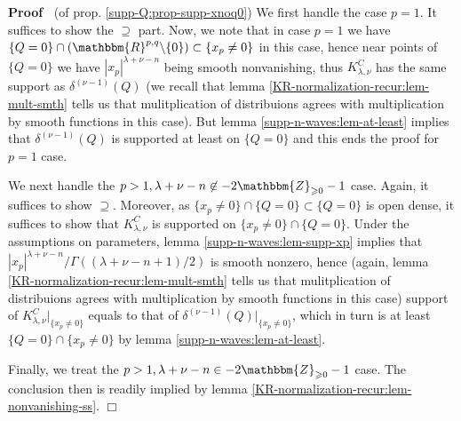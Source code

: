 \documentclass{article}
\newcommand{\nin}{\not\in}
\newenvironment{proof}{\noindent\textbf{Proof\ }}{\hspace*{\fill}$\Box$\medskip}
\numberwithin{definition}{section}
\numberwithin{lemma}{section}
\numberwithin{proposition}{section}
{\theorembodyfont{\rmfamily}\newtheorem{remark}{Remark}
\numberwithin{remark}{section}
}
\begin{document}
\begin{proof}
  (of prop. \ref{supp-Q:prop-supp-xnoq0}) We first handle the case $p = 1$. It
  suffices to show the $\supseteq$ part. Now, we note that in case $p = 1$ we
  have $\{ Q = 0 \} \cap ( \mathbbm{R}^{p, q} \backslash \{ 0 \}) \subset \{
  x_p \neq 0 \}$ in this case, hence near points of $\{ Q = 0 \}$ we have $|
  x_p |^{\lambda + \nu - n}$ being smooth nonvanishing, thus $K_{\lambda,
  \nu}^C$ has the same support as $\delta^{( \nu - 1)} ( Q)$ (we recall that
  lemma \ref{KR-normalization-recur:lem-mult-smth} tells us that
  mulitplication of distribuions agrees with multiplication by smooth
  functions in this case). But lemma \ref{supp-n-waves:lem-at-least} implies
  that $\delta^{( \nu - 1)} ( Q)$ is supported at least on $\{ Q = 0 \}$ and
  this ends the proof for $p = 1$ case.
  
  We next handle the $p > 1, \lambda + \nu - n \nin - 2\mathbbm{Z}_{\geqslant
  0} - 1$ case. Again, it suffices to show $\supseteq$. Moreover, as $\{ x_p
  \neq 0 \} \cap \{ Q = 0 \} \subset \{ Q = 0 \}$ is open dense, it suffices
  to show that $K_{\lambda, \nu}^C$ is supported on $\{ x_p \neq 0 \} \cap \{
  Q = 0 \}$. Under the assumptions on parameters, lemma
  \ref{supp-n-waves:lem-supp-xp} implies that $| x_p |^{\lambda + \nu - n} /
  \Gamma ( ( \lambda + \nu - n + 1) / 2)$ is smooth nonzero, hence (again,
  lemma \ref{KR-normalization-recur:lem-mult-smth} tells us that
  mulitplication of distribuions agrees with multiplication by smooth
  functions in this case) support of $K_{\lambda, \nu}^C |_{\{ x_p \neq 0 \}}$
  equals to that of $\delta^{( \nu - 1)} ( Q) |_{\{ x_p \neq 0 \}}$, which in
  turn is at least $\{ Q = 0 \} \cap \{ x_p \neq 0 \}$ by lemma
  \ref{supp-n-waves:lem-at-least}.
  
  Finally, we treat the $p > 1, \lambda + \nu - n \in -
  2\mathbbm{Z}_{\geqslant 0} - 1$ case. The conclusion then is readily implied
  by lemma \ref{KR-normalization-recur:lem-nonvanishing-ss}.
\end{proof}
\end{document}
